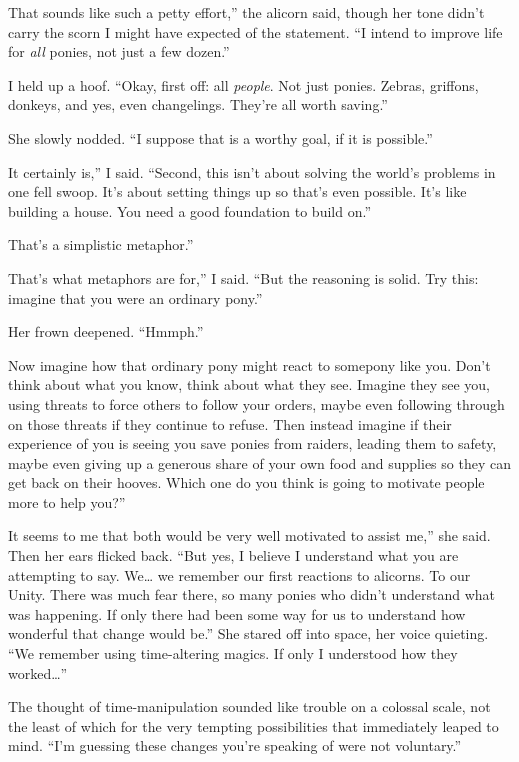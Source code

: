 \leavevmode{}That sounds like such a petty effort,” the alicorn said, though her tone didn’t carry the scorn I might have expected of the statement. “I intend to improve life for \textit{all} ponies, not just a few dozen.”

I held up a hoof. “Okay, first off: all \textit{people}. Not just ponies. Zebras, griffons, donkeys, and yes, even changelings. They’re all worth saving.”

She slowly nodded. “I suppose that is a worthy goal, if it is possible.”

\leavevmode{}It certainly is,” I said. “Second, this isn’t about solving the world’s problems in one fell swoop. It’s about setting things up so that’s even possible. It’s like building a house. You need a good foundation to build on.”

\leavevmode{}That’s a simplistic metaphor.”

\leavevmode{}That’s what metaphors are for,” I said. “But the reasoning is solid. Try this: imagine that you were an ordinary pony.”

Her frown deepened. “Hmmph.”

\leavevmode{}Now imagine how that ordinary pony might react to somepony like you. Don’t think about what you know, think about what they see. Imagine they see you, using threats to force others to follow your orders, maybe even following through on those threats if they continue to refuse. Then instead imagine if their experience of you is seeing you save ponies from raiders, leading them to safety, maybe even giving up a generous share of your own food and supplies so they can get back on their hooves. Which one do you think is going to motivate people more to help you?”

\leavevmode{}It seems to me that both would be very well motivated to assist me,” she said. Then her ears flicked back. “But yes, I believe I understand what you are attempting to say. We… we remember our first reactions to alicorns. To our Unity. There was much fear there, so many ponies who didn’t understand what was happening. If only there had been some way for us to understand how wonderful that change would be.” She stared off into space, her voice quieting. “We remember using time-altering magics. If only I understood how they worked…”

The thought of time-manipulation sounded like trouble on a colossal scale, not the least of which for the very tempting possibilities that immediately leaped to mind. “I’m guessing these changes you’re speaking of were not voluntary.”

